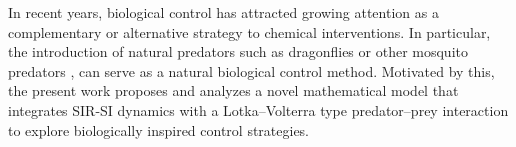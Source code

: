 \documentclass{amsart}
\theoremstyle{definition}
\theoremstyle{remark}
\numberwithin{equation}{section}
\begin{document}
In recent years, biological control has attracted growing attention as a complementary or alternative strategy to chemical interventions. In particular, the introduction of natural predators such as dragonflies \cite{Combes2013,Thu1980,Vatandoost2021} or other mosquito predators \cite{Sarfraz2019}, can serve as a natural biological control method. Motivated by this, the present work proposes and analyzes a novel mathematical model that integrates SIR-SI dynamics with a Lotka--Volterra type predator--prey interaction to explore biologically inspired control strategies. 
\end{document}
